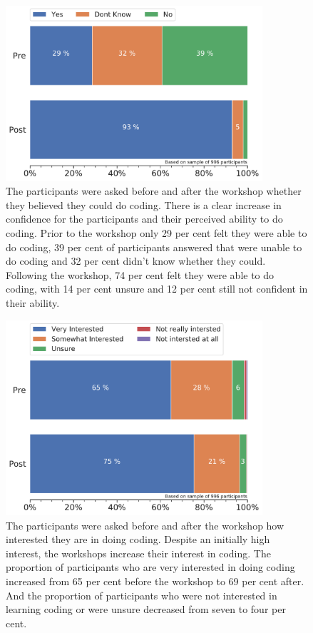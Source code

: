 \documentclass[12pt]{report} %
\begin{document}
\begin{figure}[t!]
    \centering
        \includegraphics[width=0.85\textwidth]{bar_CanDoCoding}
\caption{The participants were asked before and after the workshop whether they believed they could do coding. There is a clear increase in confidence for the participants and their perceived ability to do coding. Prior to the workshop only 29 per cent felt they were able to do coding, 39 per cent of participants answered that were unable to do coding and 32 per cent didn't know whether they could. Following the workshop, 74 per cent felt they were able to do coding, with 14 per cent unsure and 12 per cent still not confident in their ability.} 
\label{fig:ACcandocoding}
\end{figure}


\begin{figure}[t!]
    \centering
        \includegraphics[width=0.85\textwidth]{bar_CodingInterest}
\caption{The participants were asked before and after the workshop how interested they are in doing coding. Despite an initially high interest, the workshops increase their interest in coding. The proportion of participants who are very interested in doing coding increased from 65 per cent before the workshop to 69 per cent after. And the proportion of participants who were not interested in learning coding or were unsure decreased from seven to four per cent.}
\label{fig:ACcodinginterest}
\end{figure}
\end{document}
